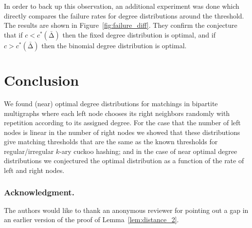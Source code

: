 \let\accentvec\vec \documentclass{llncs}
\newcommand{\figPath}{.}
\newcommand{\randv}{\ensuremath{D}}
\newcommand{\cells}{\ensuremath{m}}
\newcommand{\pmf}{\ensuremath{{\rho}}}
\newcommand{\mean}{{\mathrm{\scriptstyle\Delta}}}
\newcommand{\Amean}{\bar{\mean}}
\newcommand{\graph}{\ensuremath{G}}
\begin{document}
In order to back up this observation, an additional experiment was done which directly compares the failure rates for degree distributions
around the threshold. The results are shown in Figure~\ref{fig:failure_diff}.
They confirm the conjecture 
that if $c<c^*(\Amean)$ then the fixed degree distribution is optimal, and if $c>c^*(\Amean)$ then the binomial degree distribution is optimal.
\vspace{-0.7cm}
\begin{SCfigure}
\vspace{-0.4cm}
\scalebox{0.5}{}
\vspace{-0cm}\caption{\label{fig:failure_diff}
Difference of the failure rate of graphs $\graph   \big( \Amean,         ({\pmf}_x)_{x\in S} \big)$
with $\randv_x\in\{3,4\}, \Amean=3.5, \cells=10^3$ and different $({\pmf}_x)_{x\in S}$, as a function of $c=n/m$. 
Minuend is the failure rate using fixed degree, that is $\pmf_x(3)\in\{0,1\}$, for each $x\in S$.
Subtrahend is the failure rate using binomial degree distribution that is $\pmf_x(3)=0.5$, for each $x\in S$.
}  
\end{SCfigure}


\vspace{-1cm}
\section{Conclusion}
We found (near) optimal degree distributions for matchings
in bipartite multigraphs where each left node chooses its right neighbors randomly
with repetition according to its assigned degree.
For the case that the number of left nodes is linear in the number
of right nodes we showed that these distributions give matching thresholds
that are the same as the known thresholds for regular/irregular $k$-ary cuckoo hashing;
and in the case of near optimal degree distributions we conjectured the optimal distribution
as a function of the rate of left and right nodes.
\vspace{-0.4cm}
\subsubsection{Acknowledgment.}
The authors would like to thank an anonymous reviewer for pointing out a gap in 
an earlier version of the proof of Lemma~\ref{lem:distance_2}.
\end{document}
